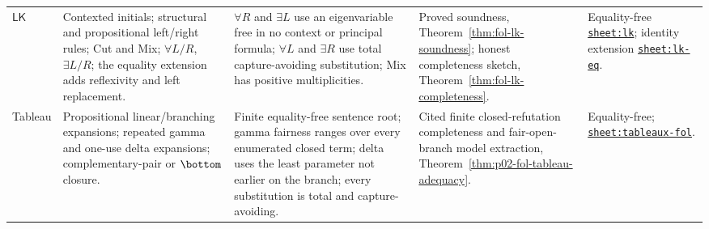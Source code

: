 \begin{landscape}
\begin{longtable}{@{}p{.65in}p{1.35in}p{1.95in}p{1.90in}p{1.25in}@{}}
\(\mathsf{LK}\) & Contexted initials; structural and propositional left/right
rules; Cut and Mix; \(\forall L/R\), \(\exists L/R\); the equality extension
adds reflexivity and left replacement. & \(\forall R\) and \(\exists L\) use
an eigenvariable free in no context or principal formula; \(\forall L\) and
\(\exists R\) use total capture-avoiding substitution; Mix has positive
multiplicities. & Proved soundness,
Theorem~\ref{thm:fol-lk-soundness}; honest completeness sketch,
Theorem~\ref{thm:fol-lk-completeness}. & Equality-free
\hyperref[sheet:lk]{\texttt{sheet:lk}}; identity extension
\hyperref[sheet:lk-eq]{\texttt{sheet:lk-eq}}. \\
Tableau & Propositional linear/branching expansions; repeated gamma and
one-use delta expansions; complementary-pair or \(\bottom\) closure. & Finite
equality-free sentence root; gamma fairness ranges over every enumerated
closed term; delta uses the least parameter not earlier on the branch; every
substitution is total and capture-avoiding. & Cited finite closed-refutation
completeness and fair-open-branch model extraction,
Theorem~\ref{thm:p02-fol-tableau-adequacy}. & Equality-free;
\hyperref[sheet:tableaux-fol]{\texttt{sheet:tableaux-fol}}. \\
\bottomrule
\end{longtable}
\endgroup
\end{landscape}
